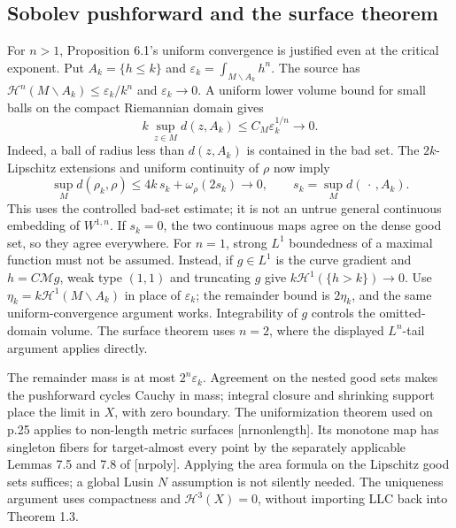 \documentclass[10pt]{article}
\begin{document}
\subsection*{Sobolev pushforward and the surface theorem}
For \(n>1\), Proposition 6.1’s uniform convergence is justified even at the critical exponent. Put \(A_k=\{h\le k\}\) and \(\varepsilon_k=\int_{M\smallsetminus A_k}h^n\). The source has \(\mathcal H^n(M\smallsetminus A_k)\le\varepsilon_k/k^n\) and \(\varepsilon_k\to0\). A uniform lower volume bound for small balls on the compact Riemannian domain gives \[k\,\sup_{z\in M}d(z,A_k)\le C_M\varepsilon_k^{1/n}\longrightarrow0.\] Indeed, a ball of radius less than \(d(z,A_k)\) is contained in the bad set. The \(2k\)-Lipschitz extensions and uniform continuity of \(\rho\) now imply \[\sup_M d(\rho_k,\rho)
 \le 4k\,s_k+\omega_\rho(2s_k)\longrightarrow0,
 \qquad s_k=\sup_M d(\,\cdot\,,A_k).\] This uses the controlled bad-set estimate; it is not an untrue general continuous embedding of \(W^{1,n}\). If \(s_k=0\), the two continuous maps agree on the dense good set, so they agree everywhere. For \(n=1\), strong \(L^1\) boundedness of a maximal function must not be assumed. Instead, if \(g\in L^1\) is the curve gradient and \(h=C\mathcal{M}g\), weak type \((1,1)\) and truncating \(g\) give \(k\mathcal H^1(\{h>k\})\to0\). Use \(\eta_k=k\mathcal H^1(M\smallsetminus A_k)\) in place of \(\varepsilon_k\); the remainder bound is \(2\eta_k\), and the same uniform-convergence argument works. Integrability of \(g\) controls the omitted-domain volume. The surface theorem uses \(n=2\), where the displayed \(L^n\)-tail argument applies directly.\par
The remainder mass is at most \(2^n\varepsilon_k\). Agreement on the nested good sets makes the pushforward cycles Cauchy in mass; integral closure and shrinking support place the limit in \(X\), with zero boundary. The uniformization theorem used on p.25 applies to non-length metric surfaces [nrnonlength]. Its monotone map has singleton fibers for target-almost every point by the separately applicable Lemmas 7.5 and 7.8 of [nrpoly]. Applying the area formula on the Lipschitz good sets suffices; a global Lusin \(N\) assumption is not silently needed. The uniqueness argument uses compactness and \(\mathcal H^3(X)=0\), without importing LLC back into Theorem 1.3.\par
\end{document}
